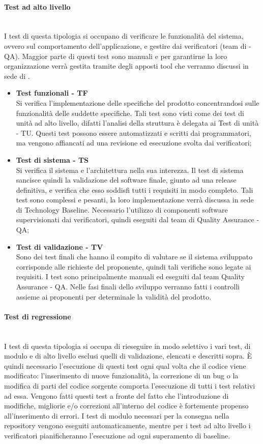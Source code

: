 \paragraph{Test ad alto livello}\mbox{}\\[0.4cm]
I test di questa tipologia si occupano di verificare le funzionalità del sistema, ovvero sul comportamento dell'applicazione, e gestire dai verificatori (team di  - QA). Maggior parte di questi test sono manuali e per garantirne la loro organizzazione verrà gestita tramite degli apposti tool che verranno discussi in sede di .
\begin{itemize}
	\item \textbf{Test funzionali - TF}\\
	Si verifica l'implementazione delle specifiche del prodotto concentrandosi sulle funzionalità delle suddette specifiche. Tali test sono visti come dei test di unità ad alto livello, difatti l'analisi della struttura è delegata ai Test di unità - TU.
	Questi test possono essere automatizzati e scritti dai programmatori, ma vengono affiancati ad una revisione ed esecuzione svolta dai verificatori;
	\item \textbf{Test di sistema - TS}\\
	Si verifica il sistema e l'architettura nella sua interezza. Il test di sistema sancisce quindi la validazione del software finale, giunto ad una release definitiva, e verifica che esso soddisfi tutti i requisiti in modo completo. Tali test sono complessi e pesanti, la loro implementazione verrà discussa in sede di Technology Baseline. Necessario l'utilizzo di componenti software supervisionati dai verificatori, quindi eseguiti dal team di Quality Assurance - QA;
	\item \textbf{Test di validazione - TV}\\
	Sono dei test finali che hanno il compito di valutare se il sistema sviluppato corrisponde alle richieste del proponente, quindi tali verifiche sono legate ai requisiti. I test sono principalmente manuali ed eseguiti dal team Quality Assurance - QA. Nelle fasi finali dello sviluppo verranno fatti i controlli assieme ai proponenti per determinale la validità del prodotto. 
\end{itemize} 
\paragraph{Test di regressione}\mbox{}\\[0.4cm]
I test di questa tipologia si occupa di rieseguire in modo selettivo i vari test, di modulo e di alto livello esclusi quelli di validazione, elencati e descritti sopra. 
È quindi necessario l'esecuzione di questi test ogni qual volta che il codice viene modificato: l'inserimento di nuove funzionalità, la correzione di un bug o la modifica di parti del codice sorgente comporta l'esecuzione di tutti i test relativi ad essa. Vengono fatti questi test a fronte del fatto che l'introduzione di modifiche, migliorie e/o correzioni all'interno del codice è fortemente propenso all'inserimento di errori. I test di modulo necessari per la consegna nella repository vengono eseguiti automaticamente, mentre per i test ad alto livello i verificatori pianificheranno l'esecuzione ad ogni superamento di baseline.
